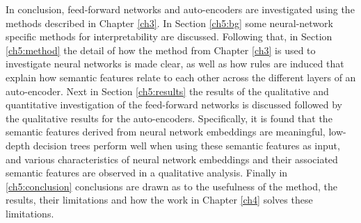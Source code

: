 In conclusion, feed-forward networks and auto-encoders are investigated using the methods described in Chapter \ref{ch3}. In Section \ref{ch5:bg} some neural-network specific methods for interpretability are discussed. Following that, in Section \ref{ch5:method} the detail of how the method from Chapter \ref{ch3} is used to investigate neural networks is made clear, as well as how rules are induced that explain how semantic features relate to each other across the different layers of an auto-encoder. Next in Section \ref{ch5:results} the results of the qualitative and quantitative investigation of the feed-forward networks is discussed followed by the qualitative results for the auto-encoders. Specifically, it is found that the semantic features derived from neural network embeddings are meaningful, low-depth decision trees perform well when using these semantic features as input, and various characteristics of neural network embeddings and their associated semantic features are observed in a qualitative analysis.  Finally in \ref{ch5:conclusion} conclusions are drawn as to the usefulness of the method, the results, their limitations and how the work in Chapter \ref{ch4} solves  these limitations. %










